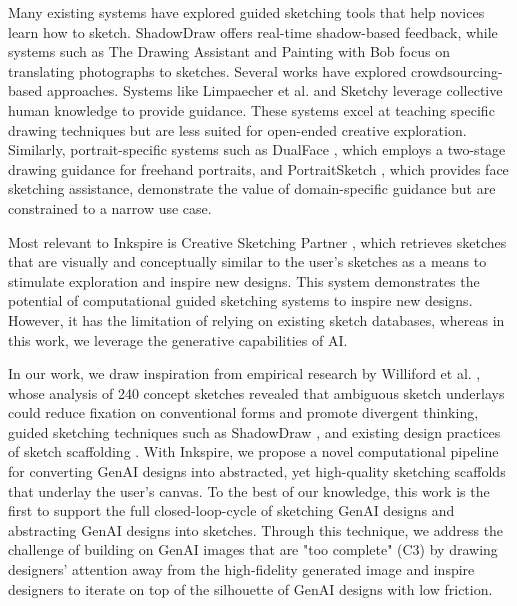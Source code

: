 \documentclass[sigconf, screen]{acmart}
\begin{document}
Many existing systems have explored guided sketching tools that help novices learn how to sketch. ShadowDraw \cite{lee2011shadowdraw} offers real-time shadow-based feedback, while systems such as The Drawing Assistant \cite{iarussi2013drawing} and Painting with Bob \cite{benedetti2014painting} focus on translating photographs to sketches. Several works have explored crowdsourcing-based approaches. Systems like Limpaecher et al. \cite{limpaecher2013real} and Sketchy \cite{sangkloy2016sketchy} leverage collective human knowledge to provide guidance. These systems excel at teaching specific drawing techniques but are less suited for open-ended creative exploration. Similarly, portrait-specific systems such as DualFace \cite{huang2022dualface}, which employs a two-stage drawing guidance for freehand portraits, and PortraitSketch \cite{xie2014portraitsketch}, which provides face sketching assistance, demonstrate the value of domain-specific guidance but are constrained to a narrow use case.

Most relevant to Inkspire is Creative Sketching Partner \cite{davis2019creative}, which retrieves sketches that are visually and conceptually similar to the user's sketches as a means to stimulate exploration and inspire new designs. This system demonstrates the potential of computational guided sketching systems to inspire new designs. However, it has the limitation of relying on existing sketch databases, whereas in this work, we leverage the generative capabilities of AI.

In our work, we draw inspiration from empirical research by Williford et al. \cite{williford2023exploring}, whose analysis of 240 concept sketches revealed that ambiguous sketch underlays could reduce fixation on conventional forms and promote divergent thinking, guided sketching techniques such as ShadowDraw \cite{lee2011shadowdraw}, and existing design practices of sketch scaffolding \cite{youtube}. With Inkspire, we propose a novel computational pipeline for converting GenAI designs into abstracted, yet high-quality sketching scaffolds that underlay the user's canvas. To the best of our knowledge, this work is the first to support the full closed-loop-cycle of sketching GenAI designs and abstracting GenAI designs into sketches. Through this technique, we address the challenge of building on GenAI images that are "too complete" (C3) by drawing designers' attention away from the high-fidelity generated image and inspire designers to iterate on top of the silhouette of GenAI designs with low friction.
\end{document}
